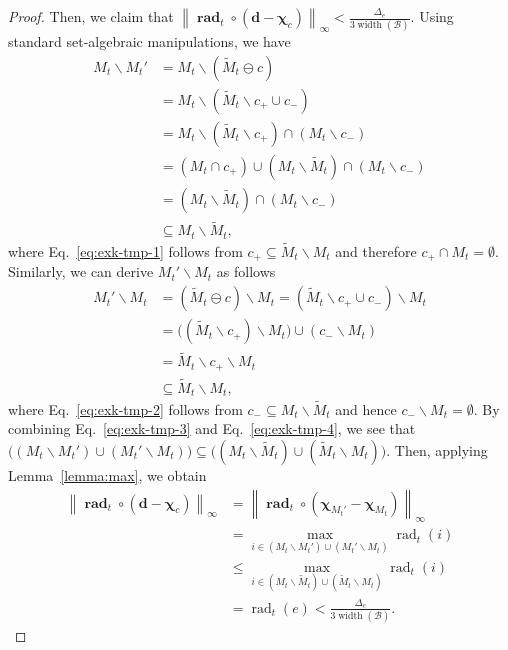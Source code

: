 \documentclass{article}
\newcommand{\B}{\mathcal B}
\newcommand{\del}{\backslash}
\DeclareMathOperator{\rank}{width}
\DeclareMathOperator{\rad}{rad}
\newcommand{\nor}[1]{\left\|#1\right\|}
\renewcommand{\vec}[1]{\boldsymbol{#1}}
\renewcommand{\odot}{\circ}
\begin{document}
\begin{proof}
Then, we claim that $\nor{\vec \rad_t \odot (\vec d-\vec \chi_c)}_\infty < \frac{\Delta_e}{3\rank(\B)}$.
Using standard set-algebraic manipulations, we have
\begin{align}
M_t \del M_t' &= M_t \del (\tilde M_t \ominus c) \nonumber\\
              &= M_t \del (\tilde M_t \del c_+ \cup c_-) \nonumber \\
              &= M_t \del (\tilde M_t \del c_+) \cap (M_t \del c_-) \nonumber \\
              &= (M_t \cap c_+) \cup (M_t \del \tilde M_t) \cap (M_t \del c_-) \nonumber\\
              &= (M_t \del \tilde M_t) \cap (M_t \del c_-) \label{eq:exk-tmp-1}\\
              &\subseteq M_t \del \tilde M_t,\label{eq:exk-tmp-3}
\end{align}
where Eq.~\eqref{eq:exk-tmp-1} follows from $c_+ \subseteq \tilde M_t\del M_t$ and therefore $c_+ \cap M_t =\emptyset$.
Similarly, we can derive $M_t' \del M_t$ as follows
\begin{align}
M_t' \del M_t &= (\tilde M_t \ominus c) \del M_t = (\tilde M_t \del c_+ \cup c_-) \del M_t \nonumber\\
              &= \big( (\tilde M_t \del c_+) \del M_t\big) \cup (c_- \del M_t) \nonumber \\
              &= \tilde M_t \del c_+ \del M_t \label{eq:exk-tmp-2}\\
              &\subseteq \tilde M_t \del M_t,\label{eq:exk-tmp-4}
\end{align}
where Eq.~\eqref{eq:exk-tmp-2} follows from $c_-\subseteq M_t\del \tilde M_t$ and hence $c_-\del M_t =\emptyset$.
By combining Eq.~\eqref{eq:exk-tmp-3} and Eq.~\eqref{eq:exk-tmp-4}, we see that $\big((M_t \del M_t') \cup (M_t'\del M_t)\big) \subseteq \big((M_t \del \tilde M_t ) \cup (\tilde M_t \del M_t)\big)$.
Then, applying Lemma~\ref{lemma:max}, we obtain
\begin{align}
   \nor{\vec \rad_t \odot (\vec d-\vec\chi_c)}_\infty 
   &= \nor{\vec \rad_t \odot (\vec \chi_{M_t'} - \vec\chi_{M_t})}_\infty \nonumber\\
   &= \max_{i\in (M_t \del M_t') \cup (M_t'\del M_t) } \rad_t(i) \nonumber \\
   &\le \max_{i\in (M_t \del \tilde M_t ) \cup (\tilde M_t \del M_t)}  \rad_t(i) \nonumber \\
   & = \rad_t(e) < \frac{\Delta_e}{3\rank(\B)} \label{eq:u-c-1-0}.
\end{align}


\end{proof}
\end{document}
